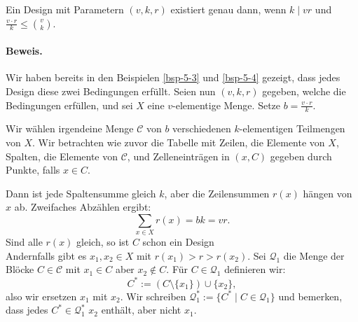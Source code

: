\documentclass[9pt]{article}
\begin{document}
\begin{satz}
Ein Design mit Parametern $(v, k, r)$ existiert genau dann, wenn $k \mid vr$ und $\frac{v \cdot r}{k} \leq \binom{v}{k}$.   \\
\paragraph{Beweis.}
Wir haben bereits in den Beispielen \ref{bsp-5-3} und \ref{bsp-5-4} gezeigt, dass jedes Design diese zwei Bedingungen erfüllt.  
Seien nun $(v, k, r)$ gegeben, welche die Bedingungen erfüllen, und sei $X$ eine $v$-elementige Menge.  
Setze $b = \frac{v \cdot r}{k}$.  

Wir wählen irgendeine Menge $\mathcal{C}$ von $b$ verschiedenen $k$-elementigen Teilmengen von $X$.  
Wir betrachten wie zuvor die Tabelle mit Zeilen, die Elemente von $X$, Spalten, die Elemente von $\mathcal{C}$,  
und Zelleneinträgen in $(x, C)$ gegeben durch Punkte, falls $x \in C$.  

Dann ist jede Spaltensumme gleich $k$, aber die Zeilensummen $r(x)$ hängen von $x$ ab. Zweifaches Abzählen  ergibt:
\[
\sum_{x \in X} r(x) = bk = vr.
\]
Sind alle $r(x)$ gleich, so ist $C$ schon ein Design \\ Andernfalls gibt es $x_1, x_2 \in X$ mit $r(x_1) > r > r(x_2)$.  
Sei $\mathcal{Q}_1$ die Menge der Blöcke $C \in \mathcal{C}$ mit $x_1 \in C$ aber $x_2 \notin C$.  
\explaindesign
Für $C \in \mathcal{Q}_1$ definieren wir:
\[
C^* := (C \setminus \{x_1\}) \cup \{x_2\},
\]
also wir ersetzen $x_1$ mit $x_2$. Wir schreiben $\mathcal{Q}_1^* := \{C^* \mid C \in \mathcal{Q}_1\}$ und bemerken, dass jedes $C^* \in \mathcal{Q}_1^*$  
$x_2$ enthält, aber nicht $x_1$.  


\end{satz}
\end{document}
